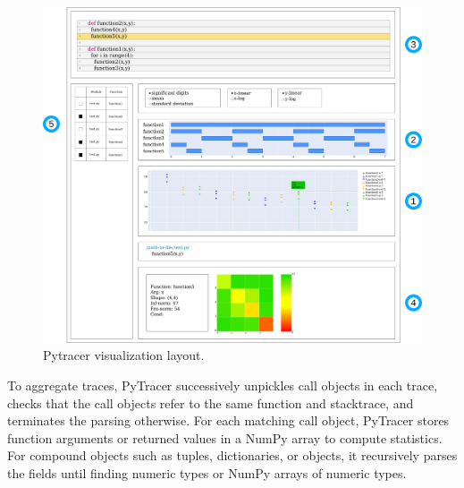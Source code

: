 \documentclass[11pt]{article}
\newcommand{\pytracer}[0]{PyTracer\xspace}
\begin{document}
\begin{figure}
    \centering
    \includegraphics[width=\textwidth]{figure/pytracer_layout.pdf}
    \caption{Pytracer visualization layout.}
    \label{fig:visu-layout}
\end{figure}


To aggregate traces, \pytracer successively unpickles call objects in each trace, checks
that the call objects refer to the same function and stacktrace, and terminates the parsing otherwise.
For each matching call object, \pytracer stores function arguments or returned values in a NumPy array to compute statistics. 
For compound objects such as tuples, dictionaries, or objects, it recursively parses the fields until finding
numeric types or NumPy arrays of numeric types.
\end{document}
